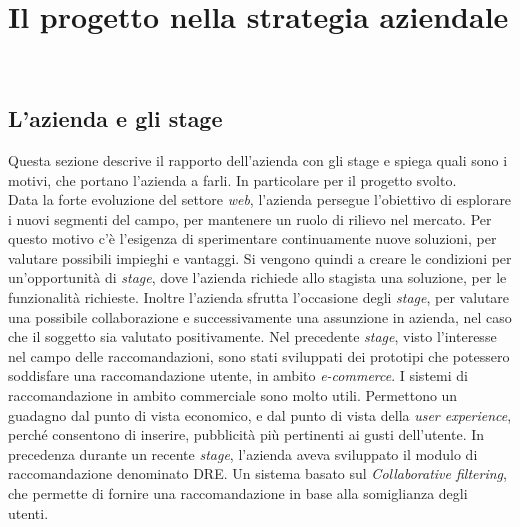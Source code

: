 
\chapter{Il progetto nella strategia aziendale}
\label{cap:il-progetto-nella-strategia-aziendale}
\\




\section{L'azienda e gli stage}
Questa sezione descrive il rapporto dell'azienda con gli stage e spiega quali sono i motivi, che portano l'azienda a farli. In particolare per il progetto svolto.\\Data la forte evoluzione del settore \emph{web}, l'azienda persegue l'obiettivo di esplorare i nuovi segmenti del campo, per mantenere un ruolo di rilievo nel mercato. Per questo motivo c'è l'esigenza di sperimentare continuamente nuove soluzioni, per valutare possibili impieghi e vantaggi. Si vengono quindi a creare le condizioni per un'opportunità di \emph{stage}, dove l'azienda richiede allo stagista una soluzione, per le funzionalità richieste. Inoltre l'azienda sfrutta l'occasione degli \emph{stage}, per valutare una possibile collaborazione e successivamente una assunzione in azienda, nel caso che il soggetto sia valutato positivamente. Nel precedente \emph{stage}, visto l'interesse nel campo delle raccomandazioni, sono stati sviluppati dei prototipi che potessero soddisfare una raccomandazione utente, in ambito \emph{e-commerce}. I sistemi di raccomandazione in ambito commerciale sono molto utili. Permettono un guadagno dal punto di vista economico, e dal punto di vista della \emph{user experience}, perché consentono di inserire, pubblicità più pertinenti ai gusti dell'utente. In precedenza durante un recente \emph{stage}, l'azienda aveva sviluppato il modulo di raccomandazione denominato DRE. Un sistema basato sul \emph{Collaborative filtering}, che permette di fornire una raccomandazione in base alla somiglianza degli utenti.
\newpage




